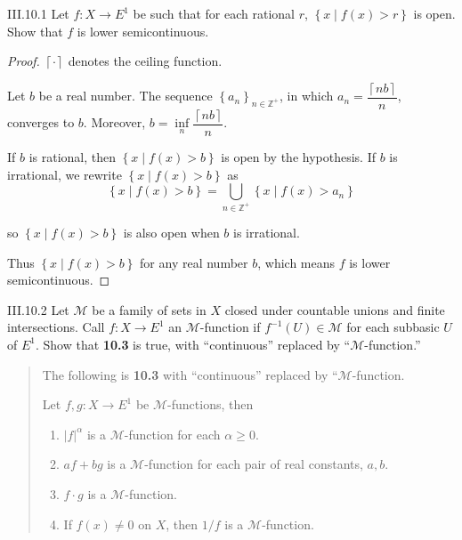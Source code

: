 \begin{problem}{III.10.1}
Let \( f: X \to E^{1} \) be such that for each rational \(r\), \( \left\{ x \mid f(x) > r \right\} \) is open. Show that \(f\) is lower semicontinuous.
\end{problem}

\begin{proof}
    \( \left\lceil \cdot \right\rceil \) denotes the ceiling function.

    Let \( b \) be a real number. The sequence \( {\left\{ a_{n} \right\}}_{n\in\mathbb{Z}^{+}} \), in which \( a_{n} = \dfrac{\left\lceil nb \right\rceil}{n} \), converges to \( b \). Moreover, \( b = \inf\limits_{n} \dfrac{\left\lceil nb \right\rceil}{n} \).

    If \( b \) is rational, then \( \left\{ x \mid f(x) > b \right\} \) is open by the hypothesis. If \( b \) is irrational, we rewrite \( \left\{ x \mid f(x) > b \right\} \) as
    \[
        \left\{ x \mid f(x) > b \right\} = \bigcup_{n \in \mathbb{Z}^{+}} \left\{ x \mid f(x) > a_{n} \right\}
    \]

    so \( \left\{ x \mid f(x) > b \right\} \) is also open when \( b \) is irrational.

    Thus \( \left\{ x \mid f(x) > b \right\} \) for any real number \( b \), which means \( f \) is lower semicontinuous.
\end{proof}

\begin{problem}{III.10.2}
Let \( \mathscr{M} \) be a family of sets in \(X\) closed under countable unions and finite intersections. Call \(f: X \to E^{1} \) an \( \mathscr{M} \)-function if \( f^{-1}(U) \in \mathscr{M} \) for each subbasic \( U \) of \( E^{1} \). Show that \textbf{10.3} is true, with ``continuous'' replaced by ``\( \mathscr{M} \)-function.\@''
\end{problem}

\begin{quote}
    The following is \textbf{10.3} with ``continuous'' replaced by ``\( \mathscr{M} \)-function.

    Let \( f, g: X \to E^{1} \) be \( \mathscr{M} \)-functions, then
    \begin{enumerate}[label={(\arabic*)}]
        \item \( {\left\vert f \right\vert}^{\alpha} \) is a \( \mathscr{M} \)-function for each \( \alpha \ge 0 \).
        \item \( af + bg \) is a \( \mathscr{M} \)-function for each pair of real constants, \( a, b \).
        \item \( f\cdot g \) is a \( \mathscr{M} \)-function.
        \item If \( f(x) \ne 0 \) on \(X\), then \( 1/f \) is a \( \mathscr{M} \)-function.
    \end{enumerate}
\end{quote}


